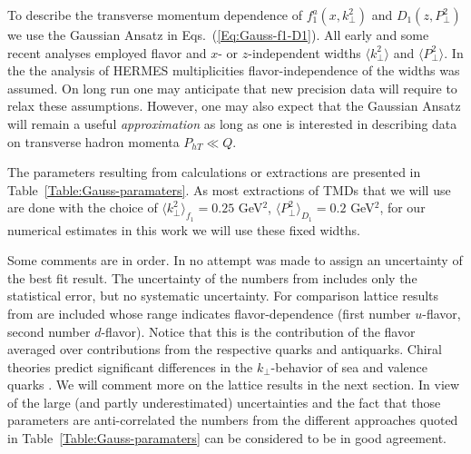 \documentclass[a4paper,11pt]{article}
\newcommand{\la}{\langle}
\newcommand{\ra}{\rangle}
\def\Phperp{P_{hT}}
\def\kperp{k_\perp}
\def\pperp{P_\perp}
\def\avkperp{\la \kperp^2 \ra}
\def\avpperp{\la \pperp^2 \ra}
\begin{document}
To describe the transverse momentum dependence of $f_1^a(x,k_\perp^2)$ 
and $D_1(z,P_\perp^2)$ we use the Gaussian Ansatz in 
Eqs.~(\ref{Eq:Gauss-f1-D1}). All early 
\cite{Anselmino:2005nn,Collins:2005ie,D'Alesio:2007jt,Schweitzer:2010tt}
and some recent \cite{Signori:2013mda} analyses employed flavor and 
$x$- or $z$-independent widths $\avkperp$ and $\avpperp$.
In the the analysis \cite{Anselmino:2013lza} 
of HERMES multiplicities flavor-independence of the widths was 
assumed. On long run one may anticipate that new precision data will 
require to relax these assumptions. However, one may also expect that the 
Gaussian Ansatz will remain a useful {\it approximation} as long as one is 
interested in describing data on transverse hadron momenta $\Phperp \ll Q $. 

The parameters resulting from calculations or extractions are presented in
Table~\ref{Table:Gauss-paramaters}. 
As most extractions of TMDs that we will use are done with the choice of 
$\avkperp_{f_1} = 0.25$ GeV$^2$, $\avpperp_{D_1}= 0.2$ GeV$^2$, for our numerical estimates in this work  we will use these fixed widths.

Some comments are in order.
In \cite{Anselmino:2005nn} no attempt was made to assign an uncertainty of the 
best fit result. The uncertainty of the numbers from \cite{Schweitzer:2010tt}
includes only the statistical error, but no systematic uncertainty.
For comparison lattice results from \cite{Hagler:2009mb} are included
whose range indicates flavor-dependence 
(first number $u$-flavor,
second number $d$-flavor). 
Notice that this is the contribution of the flavor averaged
over contributions from the respective quarks and antiquarks.
Chiral theories predict significant differences in the $\kperp$-behavior
of sea and valence quarks \cite{Schweitzer:2012hh}.
We will comment more on the lattice results in the next section.
In view of the large (and partly underestimated) uncertainties and the 
fact that those parameters are anti-correlated the numbers from the 
different approaches quoted in Table~\ref{Table:Gauss-paramaters} 
can be considered to be in good agreement. 
\end{document}
